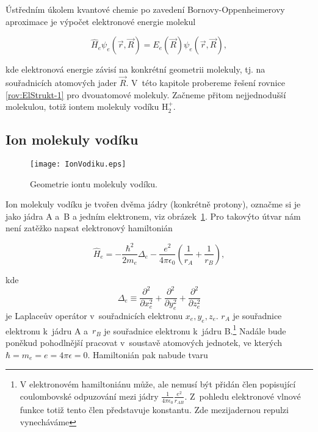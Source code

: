 \newcommand{\orbital}[3]{#1 \mathrm{#2}_{#3}}

Ústředním úkolem kvantové chemie po zavedení Bornovy-Oppenheimerovy aproximace je výpočet elektronové energie molekul

\begin{equation}
\hat{H}_e \psi_e (\vec{r}, \vec{R}) = E_e (\vec{R}) \psi_e(\vec{r}, \vec{R}),
\label{rov:ElStrukt-1}
\end{equation}

\noindent kde elektronová energie závisí na konkrétní geometrii molekuly, tj. na souřadnicích atomových jader $\vec{R}$. V~této kapitole probereme řešení rovnice \eqref{rov:ElStrukt-1} pro dvouatomové molekuly. Začneme přitom nejjednodušší molekulou, totiž iontem molekuly vodíku H$_2^+$.   

\subsection{Ion molekuly vodíku}

\begin{figure} [htb]
\centering
\texttt{[image: IonVodiku.eps]}
\caption[Ion H$_2^{+}$]{Geometrie iontu molekuly vodíku.}
\label{obr:IonVodiku}
\end{figure}

Ion molekuly vodíku je tvořen dvěma jádry (konkrétně protony), označme si je jako jádra A a~B a jedním elektronem, viz obrázek~\ref{obr:IonVodiku}. Pro takovýto útvar nám není zatěžko napsat elektronový hamiltonián

\begin{equation}
\hat{H}_e = -\frac{\hbar^2}{2 m_e} \Delta_e - \frac{e^2}{4 \pi \epsilon_0} \left( \frac{1}{r_A} + \frac{1}{r_B} \right),
\label{rov:ElStrukt-2}
\end{equation}


\noindent kde
\begin{equation}
\Delta_e \equiv \frac{\partial^2}{\partial x_e^2} + \frac{\partial^2}{\partial y_e^2} + \frac{\partial^2}{\partial z_e^2}
\nonumber
\end{equation}
je Laplaceův operátor v~souřadnicích elektronu $x_e, y_e, z_e$. $r_A$ je souřadnice elektronu k~jádru A a~$r_B$ je souřadnice elektronu k~jádru B.\footnote{V elektronovém hamiltoniánu může, ale nemusí být přidán člen popisující coulombovské odpuzování mezi jádry $\frac{1}{4 \pi \epsilon_0} \frac{e^2}{r_{AB}}$. Z~pohledu elektronové vlnové funkce totiž tento člen představuje konstantu. Zde mezijadernou repulzi vynecháváme}  Nadále bude poněkud pohodlnější pracovat v~soustavě atomových jednotek, ve kterých $\hbar = m_e=e=4\pi \epsilon = 0$. Hamiltonián pak nabude tvaru

